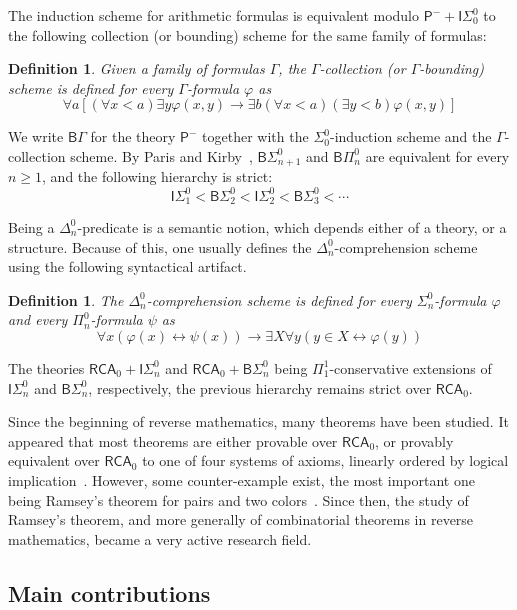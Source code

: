 \documentclass{article}
\newcommand{\Psf}{\mathsf{P}}
\newcommand{\ISig}{\mathsf{I}\Sigma^0}
\newcommand{\BSig}{\mathsf{B}\Sigma^0}
\newcommand{\BPi}{\mathsf{B}\Pi^0}
\newcommand{\RCA}[0]{\mathsf{RCA}}
\numberwithin{theorem}{section}
\newtheorem{definition}[theorem]{Definition}
\begin{document}
The induction scheme for arithmetic formulas is equivalent modulo $\Psf^- + \ISig_0$ to the following collection (or bounding) scheme for the same family of formulas:

\begin{definition}
Given a family of formulas $\Gamma$, the \emph{$\Gamma$-collection} (or $\Gamma$-bounding) scheme is defined for every $\Gamma$-formula $\varphi$ as
$$
\forall a [(\forall x < a) \exists y \varphi(x, y) \rightarrow \exists b (\forall x < a)(\exists y < b) \varphi(x, y)]
$$
\end{definition}
\noindent
We write $\mathsf{B}\Gamma$ for the theory $\Psf^-$ together with the $\Sigma^0_0$-induction scheme and the $\Gamma$-collection scheme. By Paris and Kirby~\cite{paris_n-collection_1978}, $\BSig_{n+1}$ and $\BPi_n$ are equivalent for every $n \geq 1$, and the following hierarchy is strict: 
$$
\ISig_1 < \BSig_2 < \ISig_2 < \BSig_3 < \cdots
$$
\bigskip

Being a $\Delta^0_n$-predicate is a semantic notion, which depends either of a theory, or a structure. Because of this, one usually defines the $\Delta^0_n$-comprehension scheme using the following syntactical artifact.

\begin{definition}
The \emph{$\Delta^0_n$-comprehension scheme} is defined for every $\Sigma^0_n$-formula $\varphi$ and every $\Pi^0_n$-formula $\psi$ as 
$$
\forall x(\varphi(x) \leftrightarrow \psi(x)) \to \exists X \forall y (y \in X \leftrightarrow \varphi(y))
$$
\end{definition}

The theories $\RCA_0 + \ISig_n$ and $\RCA_0 + \BSig_n$ being $\Pi^1_1$-conservative extensions of $\ISig_n$ and $\BSig_n$, respectively, the previous hierarchy remains strict over $\RCA_0$.

Since the beginning of reverse mathematics, many theorems have been studied. It appeared that most theorems are either provable over $\RCA_0$, or provably equivalent over $\RCA_0$ to one of four systems of axioms, linearly ordered by logical implication~\cite{simpson_subsystems_2009}. However, some counter-example exist, the most important one being Ramsey's theorem for pairs and two colors~\cite{seetapun1995strength,liu2012rt22}. Since then, the study of Ramsey's theorem, and more generally of combinatorial theorems in reverse mathematics, became a very active research field.

\subsection{Main contributions}
\end{document}
